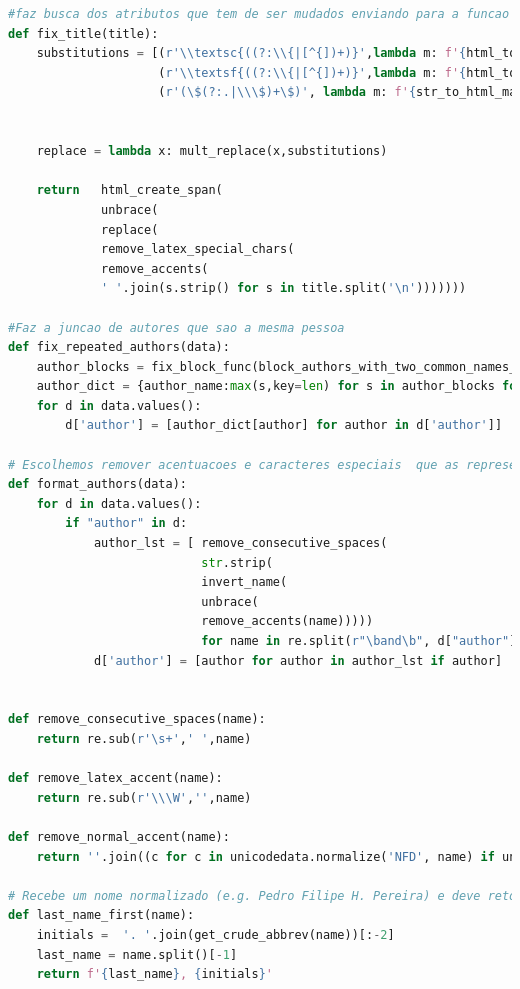 \documentclass[11pt,a4paper]{report}
\begin{document}
\begin{lstlisting}[language=python]
#faz busca dos atributos que tem de ser mudados enviando para a funcao que as realiza
def fix_title(title):
    substitutions = [(r'\\textsc{((?:\\{|[^{])+)}',lambda m: f'{html_to_small_caps(html_create_span(m.group(1)))}'),
                     (r'\\textsf{((?:\\{|[^{])+)}',lambda m: f'{html_to_sans_serif(html_create_span(m.group(1)))}'),
                     (r'(\$(?:.|\\\$)+\$)', lambda m: f'{str_to_html_math(m.group(1))}')]


    replace = lambda x: mult_replace(x,substitutions)

    return   html_create_span(
             unbrace(
             replace(
             remove_latex_special_chars(
             remove_accents(
             ' '.join(s.strip() for s in title.split('\n')))))))

#Faz a juncao de autores que sao a mesma pessoa
def fix_repeated_authors(data):
    author_blocks = fix_block_func(block_authors_with_two_common_names_v2(get_author_list(data)))
    author_dict = {author_name:max(s,key=len) for s in author_blocks for author_name in s}
    for d in data.values():
        d['author'] = [author_dict[author] for author in d['author']]

# Escolhemos remover acentuacoes e caracteres especiais  que as representam em latex (e.g. "\\~") do nome dos autores.
def format_authors(data):
    for d in data.values():
        if "author" in d:
            author_lst = [ remove_consecutive_spaces(
                           str.strip(
                           invert_name(
                           unbrace(
                           remove_accents(name)))))
                           for name in re.split(r"\band\b", d["author"].replace("\n", " "))]
            d['author'] = [author for author in author_lst if author]


def remove_consecutive_spaces(name):
    return re.sub(r'\s+',' ',name)

def remove_latex_accent(name):
    return re.sub(r'\\\W','',name)

def remove_normal_accent(name):
    return ''.join((c for c in unicodedata.normalize('NFD', name) if unicodedata.category(c) != 'Mn'))

# Recebe um nome normalizado (e.g. Pedro Filipe H. Pereira) e deve retornar "invertido" (e.g. Pereira, P. F. H.)
def last_name_first(name):
    initials =  '. '.join(get_crude_abbrev(name))[:-2]
    last_name = name.split()[-1]
    return f'{last_name}, {initials}'


\end{lstlisting}
\end{document}
